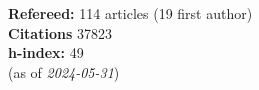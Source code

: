 \textbf{Refereed:} 114 articles (19 first author)\\\textbf{Citations} 37823\\\textbf{h-index:} 49\\(as of \textit{2024-05-31})